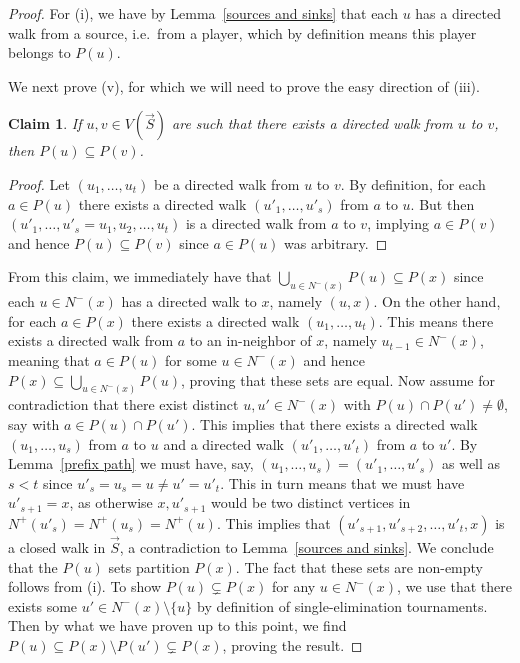 \documentclass[12pt,letterpaper]{article}
\newtheorem{claim}[thm]{Claim}
\theoremstyle{definition}
\renewcommand{\1}{\mathbbm{1}}
\newcommand{\sm}{\setminus}
\newcommand{\sub}{\subseteq}
\newcommand{\tour}{\vec{S}}
\begin{document}
\begin{proof}
	For (i), we have by Lemma~\ref{sources and sinks} that each $u$ has a directed walk from a source, i.e.\ from a player, which by definition means this player belongs to $P(u)$.
	
	We next prove (v), for which we will need to prove the easy direction of (iii).
	\begin{claim}\label{Claim for Pu}
		If $u,v\in V(\tour)$ are such that there exists a directed walk from $u$ to $v$, then $P(u)\sub P(v)$.
	\end{claim}
	\begin{proof}
		Let $(u_1,\ldots,u_t)$ be a directed walk from $u$ to $v$.  By definition, for each $a\in P(u)$ there exists a directed walk $(u'_1,\ldots,u'_s)$ from $a$ to $u$.  But then $(u'_1,\ldots,u'_s=u_1,u_2,\ldots,u_t)$ is a directed walk from $a$ to $v$, implying $a\in P(v)$ and hence $P(u)\sub P(v)$ since $a\in P(u)$ was arbitrary. 
	\end{proof}
	From this claim, we immediately have that $\bigcup_{u\in N^-(x)} P(u)\sub P(x)$ since each $u\in N^-(x)$ has a directed walk to $x$, namely $(u,x)$.  On the other hand, for each $a\in P(x)$ there exists a directed walk $(u_1,\ldots,u_t)$.  This means there exists a directed walk from $a$ to an in-neighbor of $x$, namely $u_{t-1}\in N^-(x)$, meaning that $a\in P(u)$ for some $u\in N^-(x)$ and hence $P(x)\sub \bigcup_{u\in N^-(x)} P(u)$, proving that these sets are equal.  Now assume for contradiction that there exist distinct $u,u'\in N^-(x)$ with  $P(u)\cap P(u')\ne \emptyset$, say with $a\in P(u)\cap P(u')$.  This implies that there exists a directed walk $(u_1,\ldots,u_s)$ from $a$ to $u$ and a directed walk $(u'_1,\ldots,u'_t)$ from $a$ to $u'$.  By Lemma~\ref{prefix path} we must have, say, $(u_1,\ldots,u_s)=(u'_1,\ldots,u'_s)$ as well as $s<t$ since $u'_s=u_s=u\ne u'=u'_t$.  This in turn means that we must have $u'_{s+1}= x$, as otherwise $x,u'_{s+1}$ would be two distinct vertices in $N^+(u'_s)=N^+(u_s)=N^+(u)$.  This implies that $(u'_{s+1},u'_{s+2},\ldots,u'_t,x)$ is a closed walk in $\tour$, a contradiction to Lemma~\ref{sources and sinks}.  We conclude that the $P(u)$ sets partition $P(x)$.   The fact that these sets are non-empty follows from (i).  To show $P(u)\subsetneq P(x)$ for any $u\in N^-(x)$, we use that there exists some $u'\in N^-(x)\sm \{u\}$ by definition of single-elimination tournaments.  Then by what we have proven up to this point, we find $P(u)\sub P(x)\sm P(u')\subsetneq P(x)$, proving the result.
	

\end{proof}
\end{document}
